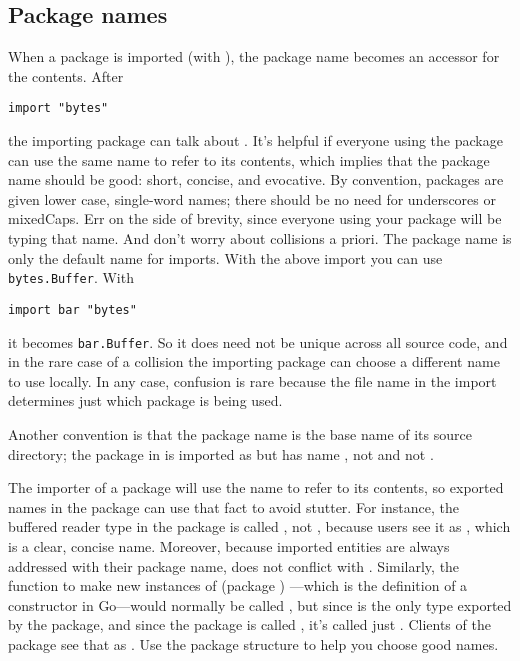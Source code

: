 \subsection{Package names}
When a package is imported (with ), the package name becomes 
an accessor for the contents. After
\begin{lstlisting}
import "bytes"
\end{lstlisting}
the importing package can talk about . It's helpful if
everyone using the package can use the same name to refer to its
contents, which implies that the package name should be good: short,
concise, and evocative. By convention, packages are given lower case,
single-word names; there should be no need for underscores or mixedCaps.
Err on the side of brevity, since everyone using your package will be
typing that name. And don't worry about collisions a priori. The package
name is only the default name for imports. With the above import 
you can use \lstinline{bytes.Buffer}. With 
\begin{lstlisting}
import bar "bytes"
\end{lstlisting}
it becomes \lstinline{bar.Buffer}.
So it does need not be unique across
all source code, and in the rare case of a collision the importing
package can choose a different name to use locally. In any case,
confusion is rare because the file name in the import determines just
which package is being used.

Another convention is that the package name is the base name of its
source directory; the package in  is imported as
 but has name , not
 and not
.

The importer of a package will use the name to refer to its contents, so 
exported names in the package can use that fact to avoid
stutter. For instance, the buffered reader type in the
package is
called , not , because users see it as
,
which is a clear, concise name. Moreover, because imported entities are
always addressed with their package name,  does not conflict
with . Similarly, the function to make new instances of
 (package ) ---which is the definition of a constructor in Go---would normally
be called , but since  is the only type exported by the
package, and since the package is called
, it's called
just .
Clients of the package see that as . Use the package structure
to help you choose good names.

